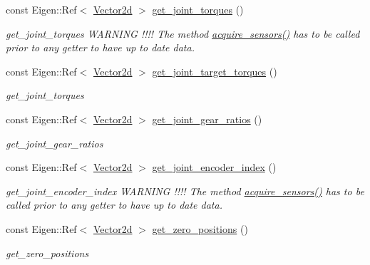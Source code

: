 \begin{DoxyCompactItemize}
const Eigen\+::\+Ref$<$ \hyperlink{common__header_8hpp_acb6916bc8c9fe9d98c484fd4cc201447}{Vector2d} $>$ \hyperlink{classblmc__robots_1_1Teststand_ae21ac86534e5ee7f15068f94957ba826}{get\+\_\+joint\+\_\+torques} ()
\begin{DoxyCompactList}\small\item\em get\+\_\+joint\+\_\+torques W\+A\+R\+N\+I\+NG !!!! The method \hyperlink{classblmc__robots_1_1Teststand_a4203e25148ab5b4ddfef3b46647213c6}{acquire\+\_\+sensors()} has to be called prior to any getter to have up to date data. \end{DoxyCompactList}\item 
const Eigen\+::\+Ref$<$ \hyperlink{common__header_8hpp_acb6916bc8c9fe9d98c484fd4cc201447}{Vector2d} $>$ \hyperlink{classblmc__robots_1_1Teststand_a0aa762511624791e4ccbec5ad664371f}{get\+\_\+joint\+\_\+target\+\_\+torques} ()
\begin{DoxyCompactList}\small\item\em get\+\_\+joint\+\_\+torques \end{DoxyCompactList}\item 
const Eigen\+::\+Ref$<$ \hyperlink{common__header_8hpp_acb6916bc8c9fe9d98c484fd4cc201447}{Vector2d} $>$ \hyperlink{classblmc__robots_1_1Teststand_a7def64b82a1cb58c9ae8c9c54bcaa887}{get\+\_\+joint\+\_\+gear\+\_\+ratios} ()
\begin{DoxyCompactList}\small\item\em get\+\_\+joint\+\_\+gear\+\_\+ratios \end{DoxyCompactList}\item 
const Eigen\+::\+Ref$<$ \hyperlink{common__header_8hpp_acb6916bc8c9fe9d98c484fd4cc201447}{Vector2d} $>$ \hyperlink{classblmc__robots_1_1Teststand_a2fa7aacb213c7898bb04f791ca3687d1}{get\+\_\+joint\+\_\+encoder\+\_\+index} ()
\begin{DoxyCompactList}\small\item\em get\+\_\+joint\+\_\+encoder\+\_\+index W\+A\+R\+N\+I\+NG !!!! The method \hyperlink{classblmc__robots_1_1Teststand_a4203e25148ab5b4ddfef3b46647213c6}{acquire\+\_\+sensors()} has to be called prior to any getter to have up to date data. \end{DoxyCompactList}\item 
const Eigen\+::\+Ref$<$ \hyperlink{common__header_8hpp_acb6916bc8c9fe9d98c484fd4cc201447}{Vector2d} $>$ \hyperlink{classblmc__robots_1_1Teststand_adbceb17de729cced8e9985b9177efa7c}{get\+\_\+zero\+\_\+positions} ()
\begin{DoxyCompactList}\small\item\em get\+\_\+zero\+\_\+positions \end{DoxyCompactList}\item 

\end{DoxyCompactItemize}
